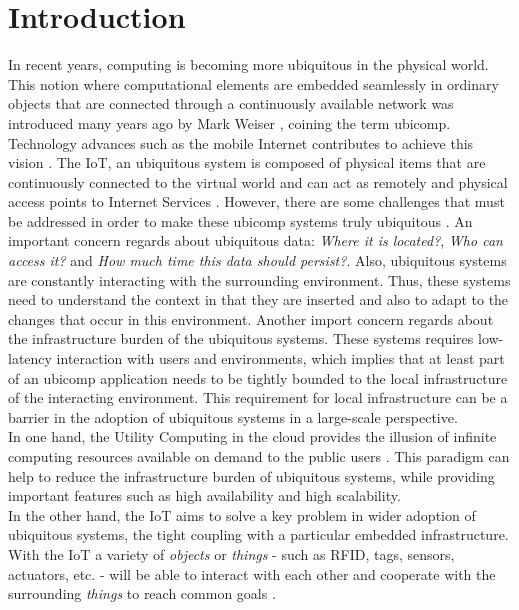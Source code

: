 
\chapter{Introduction}
\label{chapter:introduction}
In recent years, computing is becoming more ubiquitous in the physical world. This notion where
computational elements are embedded seamlessly in ordinary objects that are connected through a
continuously available network was introduced many years ago by Mark Weiser \cite{weiser1991computer},
coining the term \gls{ubicomp}. Technology advances such as the mobile Internet contributes to
achieve this vision \cite{gubbi2013internet}. The \gls{IoT}, an ubiquitous system is composed of
physical items that are continuously connected to the virtual world and can act as remotely and
physical access points to Internet Services \cite{mattern2010internet}. However, there are some
challenges that must be addressed in order to make these \gls{ubicomp} systems truly ubiquitous
\cite{caceres2012ubicomp}. An important concern regards about ubiquitous data: \textit{Where it is located?},
\textit{Who can access it?} and \textit{How much time this data should persist?}. Also, ubiquitous systems
are constantly interacting with the surrounding environment. Thus, these systems need to understand
the context in that they are inserted and also to adapt to the changes that occur in this environment.
Another import concern regards about the infrastructure burden of the ubiquitous systems. These
systems requires low-latency interaction with users and environments, which implies that at least part
of an \gls{ubicomp} application needs to be tightly bounded to the local infrastructure of the interacting
environment. This requirement for local infrastructure can be a barrier in the adoption of ubiquitous
systems in a large-scale perspective.\\

In one hand, the Utility Computing in the cloud provides the illusion of infinite computing resources
available on demand to the public users \cite{armbrust2010view}. This paradigm can help to reduce the
infrastructure burden of ubiquitous systems, while providing important features such as high availability
and high scalability.\\

In the other hand, the \gls{IoT} aims to solve a key problem in wider adoption of ubiquitous systems,
the tight coupling with a particular embedded infrastructure. With the \gls{IoT} a variety of
\textit{objects} or \textit{things} - such as \gls{RFID}, tags, sensors, actuators, etc. - will be
able to interact with each other and cooperate with the surrounding \textit{things} to reach common
goals \cite{atzori2010internet}.\\

